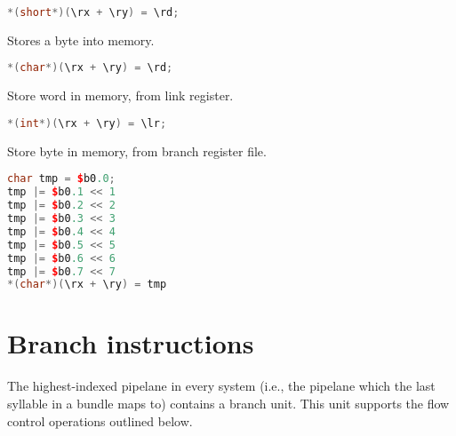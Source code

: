 \begin{lstlisting}[numbers=none, basicstyle=\ttfamily\footnotesize, language=C++]
*(short*)(\rx + \ry) = \rd;
\end{lstlisting}

Stores a byte into memory.

\begin{lstlisting}[numbers=none, basicstyle=\ttfamily\footnotesize, language=C++]
*(char*)(\rx + \ry) = \rd;
\end{lstlisting}

Store word in memory, from link register.

\begin{lstlisting}[numbers=none, basicstyle=\ttfamily\footnotesize, language=C++]
*(int*)(\rx + \ry) = \lr;
\end{lstlisting}

Store byte in memory, from branch register file.

\begin{lstlisting}[numbers=none, basicstyle=\ttfamily\footnotesize, language=C++]
char tmp = $b0.0;
tmp |= $b0.1 << 1
tmp |= $b0.2 << 2
tmp |= $b0.3 << 3
tmp |= $b0.4 << 4
tmp |= $b0.5 << 5
tmp |= $b0.6 << 6
tmp |= $b0.7 << 7
*(char*)(\rx + \ry) = tmp
\end{lstlisting}

\section{Branch instructions}

The highest-indexed pipelane in every \rvex{} system (i.e., the pipelane which
the last syllable in a bundle maps to) contains a branch unit. This unit
supports the flow control operations outlined below.

